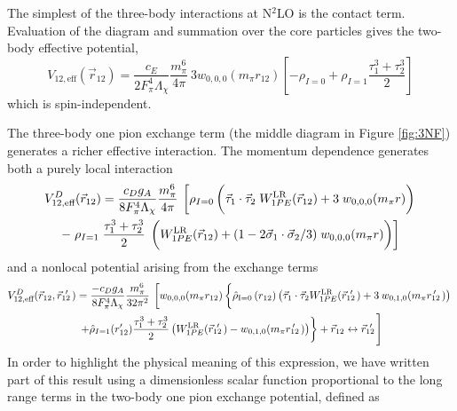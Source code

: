 \documentclass[%
 preprint,
 amsmath,amssymb,
 aps,
]{revtex4-1}
\newcommand{\rhohat}[2]{\hat{\rho}_{\text{I}=#1}\left( #2 \right)}
\newcommand{\yukawa}[1]{\frac{e^{-m_\pi |#1|}}{4\pi |#1|}}
\newcommand{\rot}{\vec{r}_{12}}
\newcommand{\rotp}{\vec{r}_{12}\!\!\!'\,\,}
\newcommand{\rotpr}{r_{12}\!\!\!\!'\,\,\,}
\newcommand{\taudot}{\vec{\tau}_1\cdot\vec{\tau}_2}
\newcommand{\tauplusthree}{\frac{\tau_1^3+\tau_2^3}{2}}
\newcommand{\sigmadot}{\vec{\sigma}_1\cdot\vec{\sigma}_2}
\newcommand{\fracphantom}{\vphantom{\frac{1}{1}}}
\newcommand{\w}[4]{w_{#1,#2,#3}(#4)}
\begin{document}
The simplest of the three-body interactions at N$^2$LO is the contact term. Evaluation of the diagram and summation over the core particles gives the two-body effective potential,
\begin{equation}
V_{12,\text{eff}}(\vec{r}_{12})=\frac{c_E }{2F_\pi^4\Lambda_\chi}\frac{m_\pi^6}{4\pi}\:3\w{0}{0}{0}{m_\pi r_{12}}\left[-\rho_{I=0}+ \rho_{I=1}\tauplusthree \right]
\end{equation}
which is spin-independent.

The three-body one pion exchange term (the middle diagram in Figure \ref{fig:3NF}) generates a richer effective interaction. The momentum dependence generates both a purely local interaction
\begin{multline}
V^{D}_{12,\text{eff}}(\rot)=
\frac{c_D g_A}{8 F_\pi^4 \Lambda_\chi} \frac{m_\pi^6}{4\pi}\: \left[\rho_{I=0}\left(\fracphantom\taudot\; W^{\text{LR}}_{1PE}(\rot)  +3\;\w{0}{0}{0}{m_\pi r}\right) \right. \\
-\left. \rho_{I=1}\;\tauplusthree \;\left(\fracphantom W^{\text{LR}}_{1PE}(\rot)+(1-2\sigmadot/3)\;\w{0}{0}{0}{m_\pi r}\right) \right]
\end{multline}
and a nonlocal potential arising from the exchange terms 
\begin{multline}\label{eq:1PENonlocal}
V^{D}_{12,\text{eff}}(\rot,\rotp)=\frac{-c_D g_A }{8 F_\pi^4 \Lambda_\chi} \frac{m_\pi^6}{32\pi^2}\:  \left[ \w{0}{0}{0}{m_\pi r_{12}} \left\{\fracphantom \rhohat{0}{r_{12}}\left(\taudot W^{\text{LR}}_{1PE}(\rotp)+3\:\w{0}{1}{0}{m_\pi \rotpr}\right) \right.\right. \\
\left.\left.+\hat{\rho}_{I=1}(r'_{12}) \tauplusthree \left( W^{\text{LR}}_{1PE}(\rotp)-\w{0}{1}{0}{m_\pi \rotpr}\right) \right\} + \rot \leftrightarrow \rotp \vphantom{\left(\yukawa{r}^2\right)} \right]
\end{multline}
In order to highlight the physical meaning of this expression, we have written part of this result using a dimensionless scalar function proportional to the long range terms in the two-body one pion exchange potential, defined as
\end{document}
